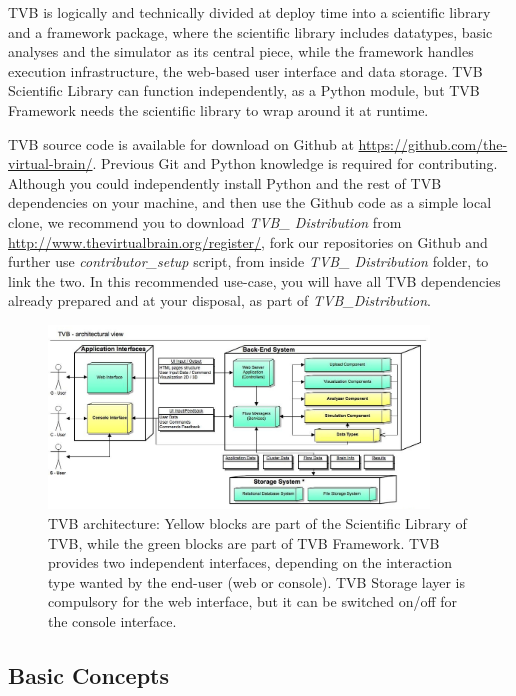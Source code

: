 
TVB is logically and technically divided at deploy time into a scientific library and a framework package, 
where the scientific library includes datatypes, basic analyses and the simulator as its central piece,
while the framework handles execution infrastructure, the web-based user interface and data storage. 
 TVB Scientific Library can function independently, as a Python module, but TVB Framework needs 
the scientific library to wrap around it at runtime.

TVB source code is available for download on Github at \url{https://github.com/the-virtual-brain/}. 
Previous Git and Python knowledge is required for contributing.
Although you could independently install Python and the rest of TVB dependencies on your machine, 
and then use the Github code as a simple local clone, we recommend you to download \emph{TVB\_ Distribution}
from \url{http://www.thevirtualbrain.org/register/}, fork our repositories on Github and further use
\emph{contributor\_setup} script, from inside \emph{TVB\_ Distribution} folder, to link the two. 
In this recommended use-case, you will have all TVB dependencies already prepared and at your disposal, 
as part of \emph{TVB\_Distribution}.

 \begin{figure}
        \centering
        \includegraphics[width=0.90\textwidth]{images/architecture.jpg}
        \caption{TVB architecture: 
        Yellow blocks are part of the Scientific Library of TVB, while the green blocks are part of TVB Framework.
        TVB provides two independent interfaces, depending on the interaction type wanted by the end-user (web or console).
        TVB Storage layer is compulsory for the web interface, but it can be switched on/off for the console interface.
         }
        \label{fig:architecture}
 \end{figure}

	\subsection{Basic Concepts}

